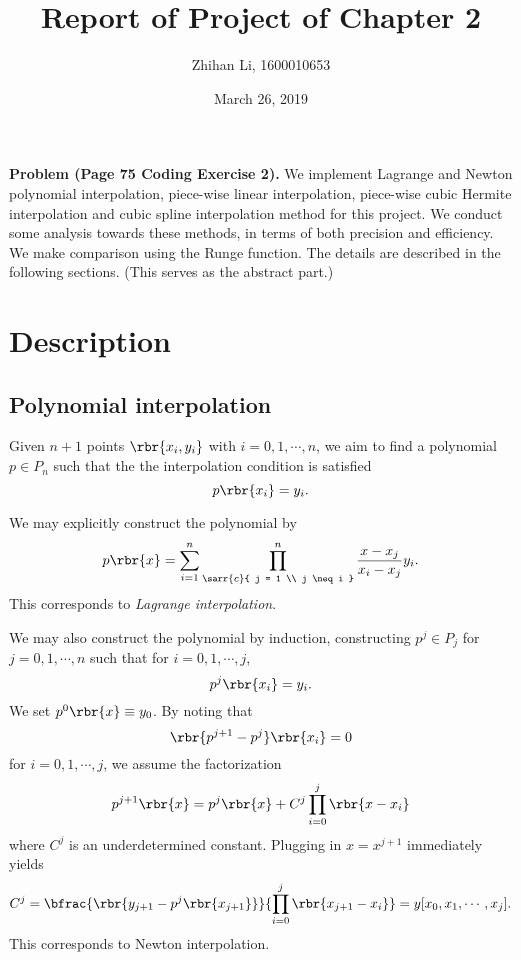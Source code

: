 \documentclass[english, nochinese]{pnote}
\title{Report of Project of Chapter 2}
\author{Zhihan Li, 1600010653}
\date{March 26, 2019}
\begin{document}
\maketitle

\textbf{Problem (Page 75 Coding Exercise 2).} We implement Lagrange and Newton polynomial interpolation, piece-wise linear interpolation, piece-wise cubic Hermite interpolation and cubic spline interpolation method for this project. We conduct some analysis towards these methods, in terms of both precision and efficiency. We make comparison using the Runge function. The details are described in the following sections. {\color{red}(This serves as the abstract part.)}

\section{Description}

\subsection{Polynomial interpolation}

Given $ n + 1 $ points $ \rbr{ x_i, y_i } $ with $ i = 0, 1, \cdots, n $, we aim to find a polynomial $ p \in P_n $ such that the the interpolation condition is satisfied
\begin{equation}
p \rbr{x_i} = y_i.
\end{equation}

We may explicitly construct the polynomial by
\begin{equation} \label{Eq:Lagr}
p \rbr{x} = \sum_{ i = 1 }^n \prod_{\sarr{c}{ j = 1 \\ j \neq i }}^n \frac{ x - x_j }{ x_i - x_j } y_i.
\end{equation}
This corresponds to \emph{Lagrange interpolation}.

We may also construct the polynomial by induction, constructing $ p^j \in P_j $ for $ j = 0, 1, \cdots, n $ such that for $ i = 0, 1, \cdots, j  $,
\begin{equation}
p^j \rbr{x_i} = y_i.
\end{equation}
We set $ p^0 \rbr{x} \equiv y_0 $. By noting that
\begin{equation}
\rbr{ p^{ j + 1 } - p^{j} } \rbr{x_i} = 0
\end{equation}
for $ i = 0, 1, \cdots, j $, we assume the factorization
\begin{equation}
p^{ j + 1 } \rbr{x} = p^j \rbr{x} + C^j \prod_{ i = 0 }^j \rbr{ x - x_i }
\end{equation}
where $C^j$ is an underdetermined constant. Plugging in $ x = x^{ j + 1 } $ immediately yields
\begin{equation} \label{Eq:NewtCoef}
C^j = \bfrac{\rbr{ y_{ j + 1 } - p^j \rbr{x_{ j + 1 }} }}{ \prod_{ i = 0 }^j \rbr{ x_{ j + 1 } - x_i } } = y [ x_0, x_1, \cdots, x_j ].
\end{equation}
This corresponds to Newton interpolation.
\end{document}
